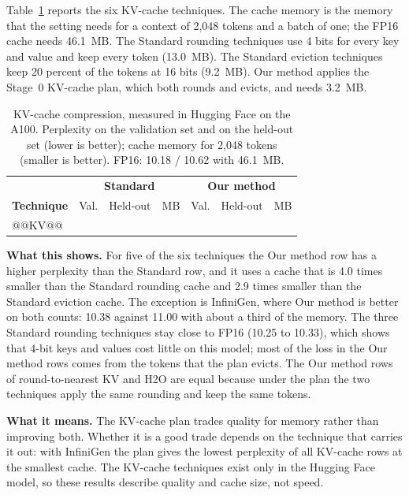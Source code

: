 Table~\ref{tab:ch5-kv} reports the six KV-cache techniques. The cache memory is the memory that the setting needs for a context of 2{,}048 tokens and a batch of one; the FP16 cache needs 46.1~MB. The Standard rounding techniques use 4 bits for every key and value and keep every token (13.0~MB). The Standard eviction techniques keep 20 percent of the tokens at 16 bits (9.2~MB). Our method applies the Stage~0 KV-cache plan, which both rounds and evicts, and needs 3.2~MB.

\begin{table}[htbp]
\centering
\small
\caption{KV-cache compression, measured in Hugging Face on the A100. Perplexity on the validation set and on the held-out set (lower is better); cache memory for 2{,}048 tokens (smaller is better). FP16: 10.18 / 10.62 with 46.1~MB.}
\label{tab:ch5-kv}
\renewcommand{\arraystretch}{1.15}
\begin{tabularx}{\textwidth}{Xrrrrrr}
\hline
 & \multicolumn{3}{c}{\textbf{Standard}} & \multicolumn{3}{c}{\textbf{Our method}} \\
\textbf{Technique} & Val. & Held-out & MB & Val. & Held-out & MB \\
\hline
@@KV@@
\hline
\end{tabularx}
\end{table}

\textbf{What this shows.} For five of the six techniques the Our method row has a higher perplexity than the Standard row, and it uses a cache that is 4.0 times smaller than the Standard rounding cache and 2.9 times smaller than the Standard eviction cache. The exception is InfiniGen, where Our method is better on both counts: 10.38 against 11.00 with about a third of the memory. The three Standard rounding techniques stay close to FP16 (10.25 to 10.33), which shows that 4-bit keys and values cost little on this model; most of the loss in the Our method rows comes from the tokens that the plan evicts. The Our method rows of round-to-nearest KV and H2O are equal because under the plan the two techniques apply the same rounding and keep the same tokens.

\textbf{What it means.} The KV-cache plan trades quality for memory rather than improving both. Whether it is a good trade depends on the technique that carries it out: with InfiniGen the plan gives the lowest perplexity of all KV-cache rows at the smallest cache. The KV-cache techniques exist only in the Hugging Face model, so these results describe quality and cache size, not speed.

